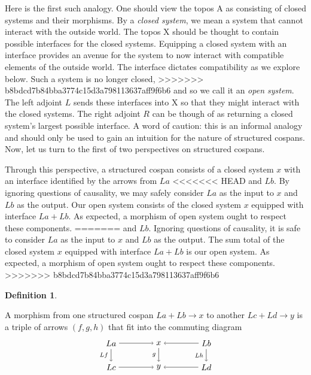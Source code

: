 \documentclass{amsart}
\newcommand{\A}{\cat{A}}
\newcommand{\X}{\cat{X}}
\newcommand{\cat}[1]{\mathrm{#1}}
\newcommand{\csp}[3]{#1 + #3 \to #2}
\theoremstyle{remark}
\theoremstyle{definition}
\newtheorem{definition}[theorem]{Definition}
\begin{document}
Here is the first such analogy. One should view the topos $ \A $ as
consisting of closed systems and their morphisms. By a \emph{closed
  system}, we mean a system that cannot interact with the outside
world. The topos $ \X $ should be thought to contain possible
interfaces for the closed systems. Equipping a closed system with an
interface provides an avenue for the system to now interact with
compatible elements of the outside world. The interface dictates
compatibility as we explore below.  Such a system is no longer closed,
>>>>>>> b8bdcd7b84bba3774c15d3a798113637aff9f6b6
and so we call it an \emph{open system}. The left adjoint $ L $ sends
these interfaces into $ \X $ so that they might interact with the
closed systems. The right adjoint $ R $ can be though of as returning
a closed system's largest possible interface. A word of caution: this
is an informal analogy and should only be used to gain an intuition
for the nature of structured cospans. Now, let us turn to the first of
two perspectives on structured cospans.

Through this perspective, a structured cospan consists of a closed
system $ x $ with an interface identified by the arrows from $ La $
<<<<<<< HEAD
and $ Lb $. By ignoring questions of causality, we may safely consider
$ La $ as the input to $ x $ and $ Lb $ as the output. Our open system
consists of the closed system $ x $ equipped with interface
$ La + Lb $. As expected, a morphism of open system
ought to respect these components.
=======
and $ Lb $. Ignoring questions of causality, it is safe to consider
$ La $ as the input to $ x $ and $ Lb $ as the output. The sum total
of the closed system $ x $ equipped with interface $ La + Lb $ is our
open system. As expected, a morphism of open system ought to respect
these components.
>>>>>>> b8bdcd7b84bba3774c15d3a798113637aff9f6b6

\begin{definition} \label{df:morph-of-strcsp}

  A morphism from one structured cospan
  \(
    \csp{La}{x}{Lb}
  \)
  to another
  \(
    \csp{Lc}{y}{Ld}
  \)
  is a triple of arrows $ ( f,g,h ) $ that fit into the commuting
  diagram
  \[
    \begin{tikzpicture}
      \node (1) at (-2,1) {\( La \)};
      \node (2) at (0,1) {\( x \)};
      \node (3) at (2,1) {\( Lb \)};
      \node (4) at (-2,0) {\( Lc \)};
      \node (5) at (0,0) {\( y \)};
      \node (6) at (2,0) {\( Ld \)};
      \draw [->] (1) to node [above] {\scriptsize{\(  \)}} (2);
      \draw [->] (3) to node [above] {\scriptsize{\(  \)}} (2);
      \draw [->] (4) to node [below] {\scriptsize{\(  \)}} (5);
      \draw [->] (6) to node [below] {\scriptsize{\(  \)}} (5);
      \draw [->] (1) to node [left] {\scriptsize{\( Lf \)}} (4);
      \draw [->] (2) to node [left] {\scriptsize{\( g \)}} (5);
      \draw [->] (3) to node [left] {\scriptsize{\( Lh \)}} (6);
    \end{tikzpicture}
  \]
\end{definition}
\end{document}
